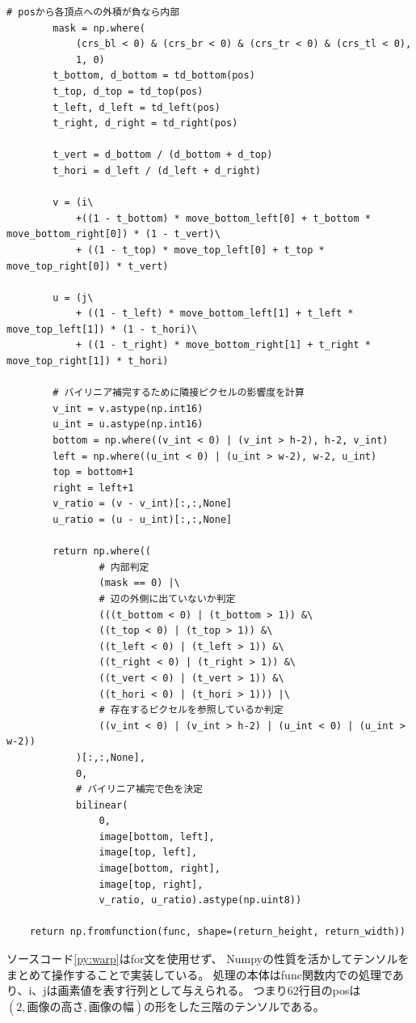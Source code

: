 \begin{lstlisting}[caption=4頂点の線形補完でのワーピング, label=py:warp]
        # posから各頂点への外積が負なら内部
        mask = np.where(
            (crs_bl < 0) & (crs_br < 0) & (crs_tr < 0) & (crs_tl < 0), 
            1, 0)
        t_bottom, d_bottom = td_bottom(pos)
        t_top, d_top = td_top(pos)
        t_left, d_left = td_left(pos)
        t_right, d_right = td_right(pos)

        t_vert = d_bottom / (d_bottom + d_top)
        t_hori = d_left / (d_left + d_right)

        v = (i\
            +((1 - t_bottom) * move_bottom_left[0] + t_bottom * move_bottom_right[0]) * (1 - t_vert)\
            + ((1 - t_top) * move_top_left[0] + t_top * move_top_right[0]) * t_vert)

        u = (j\
            + ((1 - t_left) * move_bottom_left[1] + t_left * move_top_left[1]) * (1 - t_hori)\
            + ((1 - t_right) * move_bottom_right[1] + t_right * move_top_right[1]) * t_hori)
        
        # バイリニア補完するために隣接ピクセルの影響度を計算
        v_int = v.astype(np.int16)
        u_int = u.astype(np.int16)
        bottom = np.where((v_int < 0) | (v_int > h-2), h-2, v_int)
        left = np.where((u_int < 0) | (u_int > w-2), w-2, u_int)
        top = bottom+1
        right = left+1
        v_ratio = (v - v_int)[:,:,None]
        u_ratio = (u - u_int)[:,:,None]

        return np.where((
                # 内部判定
                (mask == 0) |\
                # 辺の外側に出ていないか判定
                (((t_bottom < 0) | (t_bottom > 1)) &\
                ((t_top < 0) | (t_top > 1)) &\
                ((t_left < 0) | (t_left > 1)) &\
                ((t_right < 0) | (t_right > 1)) &\
                ((t_vert < 0) | (t_vert > 1)) &\
                ((t_hori < 0) | (t_hori > 1))) |\
                # 存在するピクセルを参照しているか判定
                ((v_int < 0) | (v_int > h-2) | (u_int < 0) | (u_int > w-2))
            )[:,:,None],
            0, 
            # バイリニア補完で色を決定
            bilinear(
                0, 
                image[bottom, left],
                image[top, left],
                image[bottom, right],
                image[top, right],
                v_ratio, u_ratio).astype(np.uint8))

    return np.fromfunction(func, shape=(return_height, return_width))
\end{lstlisting}
ソースコード\ref{py:warp}はfor文を使用せず、
Numpyの性質を活かしてテンソルをまとめて操作することで実装している。
処理の本体はfunc関数内での処理であり、i、jは画素値を表す行列として与えられる。
つまり62行目のposは$(2, 画像の高さ, 画像の幅)$の形をした三階のテンソルである。

